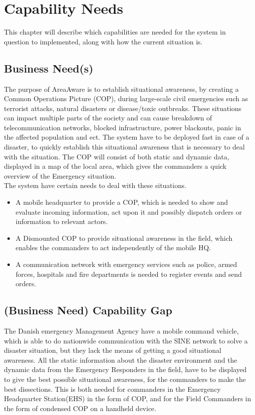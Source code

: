 \chapter{Capability Needs}
\label{chp_need}

This chapter will describe which capabilities are needed for the system in question to implemented, along with how the current situation is.

\section{Business Need(s)}
The purpose of AreaAware is to establish situational awareness, by creating a Common Operations Picture (COP), during large-scale civil emergencies such as terrorist attacks, natural disasters or disease/toxic outbreaks. These situations can impact multiple parts of the society and can cause breakdown of telecommunication networks, blocked infrastructure, power blackouts, panic in the affected population and ect. The system have to be deployed fast in case of a disaster, to quickly establish this situational awareness that is necessary to deal with the situation. The COP will consist of both static and dynamic data, displayed in a map of the local area, which gives the commanders a quick overview of the Emergency situation. \\

\noindent The system have certain needs to deal with these situations.

\begin{itemize}
	\itemsep0em
	\item A mobile headquarter to provide a COP, which is needed to show and evaluate incoming information, act upon it and possibly dispatch orders or information to relevant actors.
	\item A Dismounted COP to provide situational awareness in the field, which enables the commanders to act independently of the mobile HQ.
	\item A communication network with emergency services such as police, armed forces, hospitals and fire departments is needed to register events and send orders.
\end{itemize}

\section{(Business Need) Capability Gap}
The Danish emergency Management Agency have a mobile command vehicle, which is able to do nationwide communication with the SINE network to solve a disaster situation, but they lack the means of getting a good situational awareness. All the static information about the disaster environment and the dynamic data from the Emergency Responders in the field, have to be displayed to give the best possible situational awareness, for the commanders to make the best dissections. This is both needed for commanders in the Emergency Headquarter Station(EHS) in the form of COP, and for the Field Commanders in the form of condensed COP on a handheld device.

